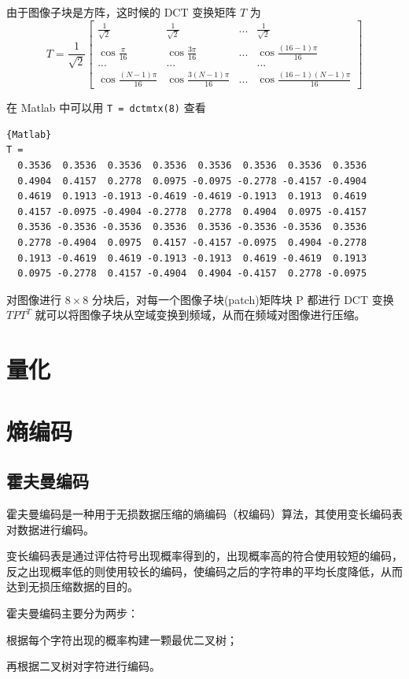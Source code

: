 由于图像子块是方阵，这时候的 DCT 变换矩阵 $T$ 为
\begin{equation}
    T=\frac{1}{\sqrt{2}}
    \begin{bmatrix}
        \frac{1}{\sqrt{2}}      & \frac{1}{\sqrt{2}}        & ...   & \frac{1}{\sqrt{2}} \\
        \cos\frac{\pi}{16}      & \cos\frac{3\pi}{16}       & ...   & \cos\frac{(16-1)\pi}{16} \\
        ...                     & ...                       &       & ... \\
        \cos\frac{(N-1)\pi}{16} & \cos\frac{3(N-1)\pi}{16}  & ...   & \cos\frac{(16-1)(N-1)\pi}{16}
    \end{bmatrix}
\end{equation}

在 Matlab 中可以用 \lstinline|T = dctmtx(8)| 查看

\begin{lstlisting}{Matlab}
T =
  0.3536  0.3536  0.3536  0.3536  0.3536  0.3536  0.3536  0.3536
  0.4904  0.4157  0.2778  0.0975 -0.0975 -0.2778 -0.4157 -0.4904
  0.4619  0.1913 -0.1913 -0.4619 -0.4619 -0.1913  0.1913  0.4619
  0.4157 -0.0975 -0.4904 -0.2778  0.2778  0.4904  0.0975 -0.4157
  0.3536 -0.3536 -0.3536  0.3536  0.3536 -0.3536 -0.3536  0.3536
  0.2778 -0.4904  0.0975  0.4157 -0.4157 -0.0975  0.4904 -0.2778
  0.1913 -0.4619  0.4619 -0.1913 -0.1913  0.4619 -0.4619  0.1913
  0.0975 -0.2778  0.4157 -0.4904  0.4904 -0.4157  0.2778 -0.0975
\end{lstlisting}

对图像进行 $8\times 8$ 分块后，对每一个图像子块(patch)矩阵块 P 都进行 DCT 变换 $TPT^T$ 就可以将图像子块从空域变换到频域，从而在频域对图像进行压缩。

\section{量化}
\section{熵编码}
\subsection{霍夫曼编码}
霍夫曼编码是一种用于无损数据压缩的熵编码（权编码）算法，其使用变长编码表对数据进行编码。

变长编码表是通过评估符号出现概率得到的，出现概率高的符合使用较短的编码，反之出现概率低的则使用较长的编码，使编码之后的字符串的平均长度降低，从而达到无损压缩数据的目的。

霍夫曼编码主要分为两步：

根据每个字符出现的概率构建一颗最优二叉树；

再根据二叉树对字符进行编码。
